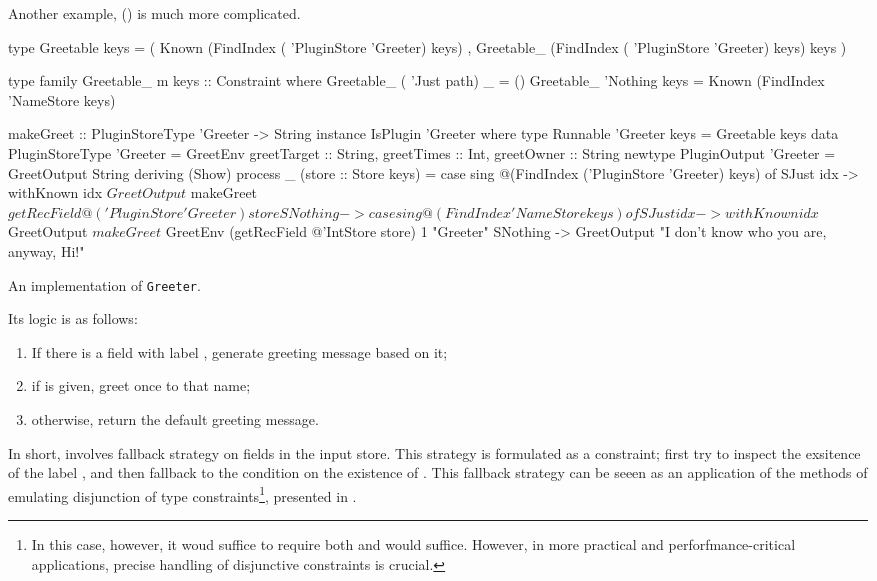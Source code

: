 \documentclass[demotion-paper.tex]{subfiles}
\begin{document}
Another example,  () is much more complicated.
\begin{listing}
\begin{code}
type Greetable keys =
  ( Known (FindIndex ( 'PluginStore 'Greeter) keys)
  , Greetable_ (FindIndex ( 'PluginStore 'Greeter) keys) keys
  )

type family Greetable_ m keys :: Constraint where
  Greetable_ ( 'Just path) _ = ()
  Greetable_ 'Nothing keys = Known (FindIndex 'NameStore keys)

makeGreet :: PluginStoreType 'Greeter -> String
instance IsPlugin 'Greeter where
  type Runnable 'Greeter keys = Greetable keys
  data PluginStoreType 'Greeter = GreetEnv
    { greetTarget :: String, greetTimes :: Int, greetOwner :: String }
  newtype PluginOutput 'Greeter = GreetOutput String deriving (Show)
  process _ (store :: Store keys) =
    case sing @(FindIndex ('PluginStore 'Greeter) keys) of
      SJust idx -> withKnown idx $ GreetOutput $
        makeGreet $ getRecField @('PluginStore 'Greeter) store
      SNothing -> case sing @(FindIndex 'NameStore keys) of
        SJust idx -> withKnown idx $ GreetOutput $ makeGreet $
          GreetEnv (getRecField @'IntStore store) 1 "Greeter"
        SNothing -> GreetOutput "I don't know who you are, anyway, Hi!"
\end{code}
\caption{An implementation of \texttt{Greeter}.}
\label{lst:plugin-greet}
\end{listing}
Its logic is as follows:
\begin{enumerate}
  \item If there is a field with label , generate greeting message based on it;
  \item if  is given, greet once to that name;
  \item otherwise, return the default greeting message.
\end{enumerate}
In short,  involves fallback strategy on fields in the input store.
This strategy is formulated as a  constraint; first try to inspect the exsitence of the label , and then fallback to the condition on the existence of .
This fallback strategy can be seeen as an application of the methods of emulating disjunction of type constraints\footnote{%
In this case, however, it woud suffice to require both  and  would suffice. However, in more practical and perforfmance-critical applications, precise handling of disjunctive constraints is crucial.},
presented in .
\end{document}
